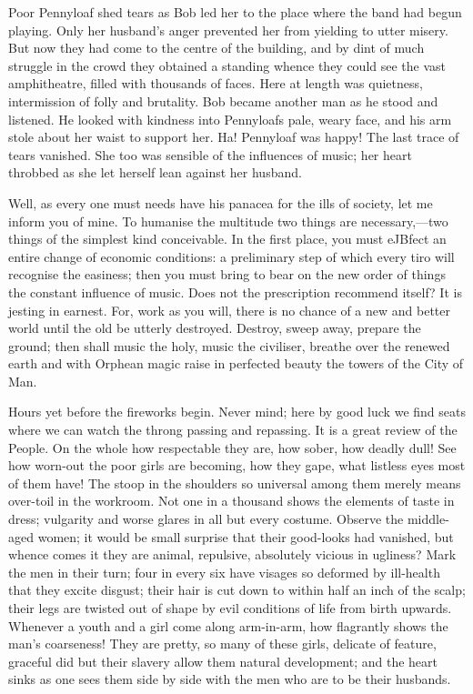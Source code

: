 Poor Pennyloaf shed tears as Bob led her to the place where the band had
begun {\protect\hypertarget{264}{}{}}playing. Only her husband's anger
prevented her from yielding to utter misery. But now they had come to
the centre of the building, and by dint of much struggle in the crowd
they obtained a standing whence they could see the vast amphitheatre,
filled with thousands of faces. Here at length was quietness,
intermission of folly and brutality. Bob became another man as he stood
and listened. He looked with kindness into Pennyloafs pale, weary face,
and his arm stole about her waist to support her. Ha! Pennyloaf was
happy! The last trace of tears vanished. She too was sensible of the
influences of music; her heart throbbed as she let herself lean against
her husband.

Well, as every one must needs have his panacea for the ills of society,
let me inform you of mine. To humanise the multitude two things are
necessary,---two things of the simplest kind conceivable. In the first
place, you must eJBfect an entire change of economic conditions: a
preliminary step of which every tiro will recognise the easiness; then
you {\protect\hypertarget{265}{}{}}must bring to bear on the new order
of things the constant influence of music. Does not the prescription
recommend itself? It is jesting in earnest. For, work as you will, there
is no chance of a new and better world until the old be utterly
destroyed. Destroy, sweep away, prepare the ground; then shall music the
holy, music the civiliser, breathe over the renewed earth and with
Orphean magic raise in perfected beauty the towers of the City of Man.

Hours yet before the fireworks begin. Never mind; here by good luck we
find seats where we can watch the throng passing and repassing. It is a
great review of the People. On the whole how respectable they are, how
sober, how deadly dull! See how worn-out the poor girls are becoming,
how they gape, what listless eyes most of them have! The stoop in the
shoulders so universal among them merely means over-toil in the
workroom. Not one in a thousand shows the elements of taste in dress;
vulgarity and worse glares in all but every costume. Observe the
{\protect\hypertarget{266}{}{}}middle-aged women; it would be small
surprise that their good-looks had vanished, but whence comes it they
are animal, repulsive, absolutely vicious in ugliness? Mark the men in
their turn; four in every six have visages so deformed by ill-health
that they excite disgust; their hair is cut down to within half an inch
of the scalp; their legs are twisted out of shape by evil conditions of
life from birth upwards. Whenever a youth and a girl come along
arm-in-arm, how flagrantly shows the man's coarseness! They are pretty,
so many of these girls, delicate of feature, graceful did but their
slavery allow them natural development; and the heart sinks as one sees
them side by side with the men who are to be their husbands.

